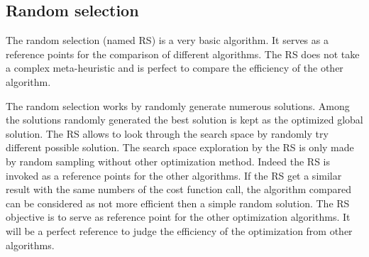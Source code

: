 

\subsection{Random selection }

The random selection (named RS) is a very basic algorithm. It serves as a reference points for the comparison of different algorithms. The RS does not take a complex meta-heuristic and is perfect to compare the efficiency of the other algorithm.

The random selection works by randomly generate numerous solutions. Among the solutions randomly generated the best solution is kept as the optimized global solution. The RS allows to look through the search space by randomly try different possible solution. The search space exploration by the RS is only made by random sampling without other optimization method. 
Indeed the RS is invoked as a reference points for the other algorithms. If the RS get a similar result with the same numbers of the cost function call, the algorithm compared can be considered as not more efficient then a simple random solution. 
The RS objective is to serve as reference point for the other optimization algorithms. It will be a perfect reference to judge the efficiency of the optimization from other algorithms.  
  
%
%

